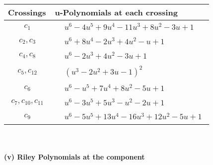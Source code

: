 \documentclass[1p]{elsarticle_modified}
\theoremstyle{definition}
\begin{document}
\begin{tabular}{m{50pt}|m{274pt}}
Crossings & \hspace{64pt}u-Polynomials at each crossing \\
\hline $$\begin{aligned}c_{1}\end{aligned}$$&$\begin{aligned}
&u^6-4 u^5+9 u^4-11 u^3+8 u^2-3 u+1
\end{aligned}$\\
\hline $$\begin{aligned}c_{2},c_{3}\end{aligned}$$&$\begin{aligned}
&u^6+8 u^4-2 u^3+4 u^2- u+1
\end{aligned}$\\
\hline $$\begin{aligned}c_{4},c_{8}\end{aligned}$$&$\begin{aligned}
&u^6-2 u^3+4 u^2-3 u+1
\end{aligned}$\\
\hline $$\begin{aligned}c_{5},c_{12}\end{aligned}$$&$\begin{aligned}
&(u^3-2 u^2+3 u-1)^2
\end{aligned}$\\
\hline $$\begin{aligned}c_{6}\end{aligned}$$&$\begin{aligned}
&u^6- u^5+7 u^4+8 u^2-5 u+1
\end{aligned}$\\
\hline $$\begin{aligned}c_{7},c_{10},c_{11}\end{aligned}$$&$\begin{aligned}
&u^6-3 u^5+5 u^3- u^2-2 u+1
\end{aligned}$\\
\hline $$\begin{aligned}c_{9}\end{aligned}$$&$\begin{aligned}
&u^6-5 u^5+13 u^4-16 u^3+12 u^2-5 u+1
\end{aligned}$\\
\hline
\end{tabular}\\~\\
\newpage\renewcommand{\arraystretch}{1}
\flushleft \textbf{(v) Riley Polynomials at the component}\newline \\
\end{document}
